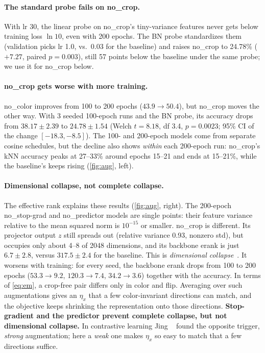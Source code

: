 \documentclass[10pt,twocolumn,letterpaper]{article}
\begin{document}
\paragraph{The standard probe fails on no\_crop.}
With lr 30, the linear probe on no\_crop's tiny-variance features never gets below training loss $\ln 10$, even with 200 epochs.
The BN probe standardizes them (validation picks lr 1.0, vs.\ 0.03 for the baseline) and raises no\_crop to 24.78\% ($+7.27$, paired $p{=}0.003$), still 57 points below the baseline under the same probe; we use it for no\_crop below.

\paragraph{no\_crop gets worse with more training.}
no\_color improves from 100 to 200 epochs ($43.9\rightarrow50.4$), but no\_crop moves the other way.
With 3 seeded 100-epoch runs and the BN probe, its accuracy drops from $38.17\pm2.39$ to $24.78\pm1.54$ (Welch $t{=}8.18$, df 3.4, $p{=}0.0023$; 95\% CI of the change $[-18.3,-8.5]$).
The 100- and 200-epoch models come from separate cosine schedules, but the decline also shows \emph{within} each 200-epoch run: no\_crop's kNN accuracy peaks at 27--33\% around epochs 15--21 and ends at 15--21\%, while the baseline's keeps rising (\cref{fig:aug}, left).

\paragraph{Dimensional collapse, not complete collapse.}
The effective rank explains these results (\cref{fig:aug}, right).
The 200-epoch no\_stop-grad and no\_predictor models are single points: their feature variance relative to the mean squared norm is $10^{-15}$ or smaller.
no\_crop is different. Its projector output $z$ still spreads out (relative variance 0.93, nonzero std), but occupies only about 4--8 of 2048 dimensions, and its backbone erank is just $6.7\pm2.8$, versus $317.5\pm2.4$ for the baseline.
This is \emph{dimensional collapse}~\cite{jing2022dimensional}.
It worsens with training: for every seed, the backbone erank drops from 100 to 200 epochs ($53.3\rightarrow9.2$, $120.3\rightarrow7.4$, $34.2\rightarrow3.6$) together with the accuracy.
In terms of \cref{eq:em}, a crop-free pair differs only in color and flip. Averaging over such augmentations gives an $\eta_x$ that a few color-invariant directions can match, and the objective keeps shrinking the representation onto those directions.
\textbf{Stop-gradient and the predictor prevent complete collapse, but not dimensional collapse.}
In contrastive learning Jing \etal~\cite{jing2022dimensional} found the opposite trigger, \emph{strong} augmentation; here a \emph{weak} one makes $\eta_x$ so easy to match that a few directions suffice.
\end{document}
